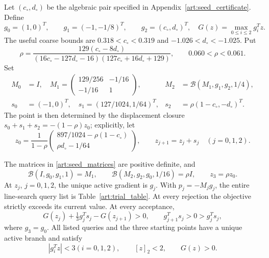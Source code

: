 Let $(c_\circ,d_\circ)$ be the algebraic pair specified in
Appendix~\ref{art:seed_certificate}. Define
\[
 g_0=(1,0)^T,\qquad g_1=(-1,-1/8)^T,\qquad g_2=(c_\circ,d_\circ)^T,
 \quad G(z)=\max_{0\le i\le2}g_i^Tz.
\]
The useful coarse bounds are $0.318<c_\circ<0.319$ and
$-1.026<d_\circ<-1.025$. Put
\begin{equation}\label{art:seed_rho}
 \rho=\frac{129(c_\circ-8d_\circ)}{(16c_\circ-127d_\circ-16)(127c_\circ+16d_\circ+129)},
 \qquad 0.060<\rho<0.061.
\end{equation}
Set
\begin{align}
 M_0&=I,\quad
 M_1=\begin{pmatrix}129/256&-1/16\\-1/16&1\end{pmatrix},
 &M_2&=\mathcal B(M_1,g_1,g_2,1/4),\label{art:seed_matrices}\\
 s_0&=(-1,0)^T,\quad s_1=(127/1024,1/64)^T,
 &s_2&=\rho(1-c_\circ,-d_\circ)^T.\label{art:seed_steps}
\end{align}
The point is then determined by the displacement closure
$s_0+s_1+s_2=-(1-\rho)z_0$; explicitly, let
\begin{equation}\label{art:seed_points}
 z_0=\frac1{1-\rho}
 \begin{pmatrix}897/1024-\rho(1-c_\circ)\\ \rho d_\circ-1/64\end{pmatrix},
 \qquad z_{j+1}=z_j+s_j\quad(j=0,1,2).
\end{equation}

\begin{lemma}\label{art:seed_cycle}
The matrices in \eqref{art:seed_matrices} are positive definite, and
\[
 \mathcal B(I,g_0,g_1,1)=M_1,\qquad
 \mathcal B(M_2,g_2,g_0,1/16)=\rho I,\qquad z_3=\rho z_0.
\]
At $z_j$, $j=0,1,2$, the unique active gradient is $g_j$.
With $p_j=-M_jg_j$, the entire line-search query list is
Table~\ref{art:trial_table}. At every rejection the objective strictly
exceeds its current value. At every acceptance,
\begin{equation}\label{art:seed_margins}
 G(z_j)+\tfrac13g_j^Ts_j-G(z_{j+1})>0,\qquad
 g_{j+1}^Ts_j>0>g_j^Ts_j,
\end{equation}
where $g_3=g_0$. All listed queries and the three starting points have a
unique active branch and satisfy
\begin{equation}\label{art:seed_query_bounds}
 |g_i^Tz|<3 (i=0,1,2),\qquad [z]_2<2,\qquad G(z)>0.
\end{equation}
\end{lemma}

